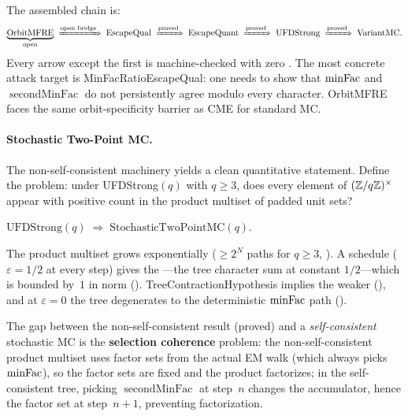 The assembled chain is:
\[
  \underbrace{\mathrm{OrbitMFRE}}_{\text{open}}
  \;\xRightarrow{\text{open bridge}}\;
  \mathrm{EscapeQual}
  \;\xRightarrow{\text{proved}}\;
  \mathrm{EscapeQuant}
  \;\xRightarrow{\text{proved}}\;
  \mathrm{UFDStrong}
  \;\xRightarrow{\text{proved}}\;
  \mathrm{VariantMC}.
\]
Every arrow except the first is machine-checked with zero .
The most concrete attack target is MinFacRatioEscapeQual: one needs to
show that $\mathrm{minFac}$ and $\operatorname{secondMinFac}$ do not
persistently agree modulo every character.  OrbitMFRE faces the same
orbit-specificity barrier as CME for standard MC.

\paragraph{Stochastic Two-Point MC.}
The non-self-consistent machinery yields a clean quantitative statement.
Define the  problem: under UFDStrong$(q)$
with $q \geq 3$, does every element of $(\mathbb{Z}/q\mathbb{Z})^\times$ appear with
positive count in the product multiset of padded unit sets?

\begin{theorem}
\label{thm:stochastic-two-point}
$\mathrm{UFDStrong}(q) \;\Longrightarrow\; \mathrm{StochasticTwoPointMC}(q)$.
\end{theorem}

\noindent The product multiset grows exponentially
($\geq 2^N$ paths for $q \geq 3$,
).
A  schedule ($\varepsilon = 1/2$ at every step) gives
the ---the tree character sum at constant
$1/2$---which is bounded by~$1$ in norm
().
TreeContractionHypothesis implies the weaker
(),
and at $\varepsilon = 0$ the tree degenerates to the deterministic
$\mathrm{minFac}$ path
().

The gap between the non-self-consistent result (proved) and a
\emph{self-consistent} stochastic MC is the \textbf{selection coherence}
problem: the non-self-consistent product multiset uses factor sets from
the actual EM walk (which always picks $\mathrm{minFac}$), so the factor sets
are fixed and the product factorizes; in the self-consistent tree,
picking $\operatorname{secondMinFac}$ at step~$n$ changes the
accumulator, hence the factor set at step~$n{+}1$, preventing
factorization.

